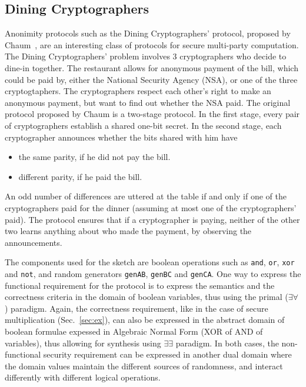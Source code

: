 \documentclass[preprint]{sig-alternate-05-2015}
\begin{document}
\subsection{Dining Cryptographers}

Anonimity protocols such as the Dining Cryptographers' protocol,
proposed by Chaum~\cite{Chaum88}, are an interesting class of protocols for secure
multi-party computation.
The Dining Cryptographers' problem involves 3 cryptographers who decide to
dine-in together. The restaurant allows for anonymous payment of the bill,
which could be paid by, either the National Security Agency (NSA),
or one of the three cryptogtaphers.
The cryptographers respect each other's right to make an anonymous payment, 
but want to find out whether the NSA paid.
The original protocol proposed by Chaum is a two-stage protocol.
In the first stage, every pair of cryptographers establish 
a shared one-bit secret. 
In the second stage, each cryptographer announces 
whether the bits shared with him have
\begin{itemize}\itemsep=0em
    \item the same parity, if he did not pay the bill.
    \item different parity, if he paid the bill.
\end{itemize}
An odd number of differences are uttered at the table if and only if
one of the cryptographers paid for the dinner (assuming at most 
one of the cryptographers' paid).
The protocol ensures that if a cryptographer is paying, 
neither of the other two learns anything about who made the payment, 
by observing the announcements.

The components used for the sketch are boolean operations such as \texttt{and},
\texttt{or}, \texttt{xor} and \texttt{not}, and random generators \texttt{genAB},
\texttt{genBC} and \texttt{genCA}.
One way to express the functional requirement for the protocol is to 
express the semantics and the correctness criteria in the domain of boolean variables,
thus using the primal ($\exists \forall$) paradigm.
Again, the correctness requirement, like in the case of secure 
multiplication (Sec.~\ref{sec:ex}), can also be expressed in the
abstract domain of boolean formulae expessed in Algebraic Normal Form 
(XOR of AND of variables), thus allowing for synthesis using $\exists \exists$
paradigm.
In both cases, the non-functional security requirement
can be expressed in another dual domain where the domain values
maintain the different sources of randomness, 
and interact differently with different logical operations.
\end{document}
